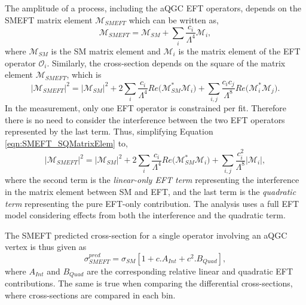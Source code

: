 The amplitude of a process, including the aQGC EFT operators, depends on the SMEFT matrix element $\mathcal{M}_{SMEFT}$ which can be written as, 
\begin{equation}
    \mathcal{M}_{SMEFT} = \mathcal{M}_{SM} + \sum_{i}{ \frac{c_{i}}{\Lambda^4}\mathcal{M}_{i}},
    \label{eqn:SMEFTMatrixElem}
\end{equation}
where $\mathcal{M}_{SM}$ is the SM matrix element and $\mathcal{M}_{i}$ is the matrix element of the EFT operator $\mathcal{O}_{i}$. Similarly, the cross-section depends on the square of the matrix element $\mathcal{M}_{SMEFT}$, which is 
\begin{equation}
    |\mathcal{M}_{SMEFT}|^2 = |\mathcal{M}_{SM}|^{2} + 2 \sum_{i}{ \frac{c_{i}}{\Lambda^4} \textit{Re}(\mathcal{M}_{SM}^{*} \mathcal{M}_{i}}) + \sum_{i,j}{ \frac{c_{i}c_{j}}{\Lambda^8} \textit{Re}(\mathcal{M}_{i}^{*} \mathcal{M}_{j}}).
    \label{eqn:SMEFT_SQMatrixElem}
\end{equation}
In the measurement, only one EFT operator is constrained per fit. Therefore there is no need to consider the interference between the two EFT operators represented by the last term. Thus, simplifying Equation \ref{eqn:SMEFT_SQMatrixElem} to, 
\begin{equation}
    |\mathcal{M}_{SMEFT}|^2 = |\mathcal{M}_{SM}|^{2} + 2 \sum_{i}{ \frac{c_{i}}{\Lambda^4} \textit{Re}(\mathcal{M}_{SM}^{*} \mathcal{M}_{i}}) + \sum_{i,j}{ \frac{c_{i}^2}{\Lambda^8} |\mathcal{M}_{i}|},
    \label{eqn:SMEFT_CrossSec}
\end{equation}
where the second term is the \textit{linear-only EFT term} representing the interference in the matrix element between SM and EFT, and the last term is the \textit{quadratic term} representing the pure EFT-only contribution. The analysis uses a full EFT model considering effects from both the interference and the quadratic term. 

The SMEFT predicted cross-section for a single operator involving an aQGC vertex is thus given as 
\begin{equation}
\sigma_{SMEFT}^{pred} = \sigma_{SM}[ 1 + c . A_{Int} + c^2 . B_{Quad} ],
\end{equation}
where $A_{Int}$ and $B_{Quad}$ are the corresponding relative linear and quadratic EFT contributions. The same is true when comparing the differential cross-sections, where cross-sections are compared in each bin. 

